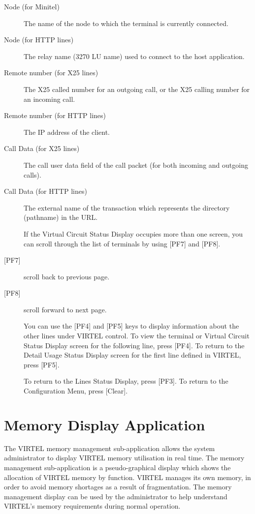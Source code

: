 \documentclass[letterpaper,10pt,english]{sphinxmanual}
\begin{document}
\begin{description}
\item[{Node (for Minitel)}] \leavevmode
The name of the node to which the terminal is currently connected.

\item[{Node (for HTTP lines)}] \leavevmode
The relay name (3270 LU name) used to connect to the host application.

\item[{Remote number (for X25 lines)}] \leavevmode
The X25 called number for an outgoing call, or the X25 calling number for an incoming call.

\item[{Remote number (for HTTP lines)}] \leavevmode
The IP address of the client.

\item[{Call Data (for X25 lines)}] \leavevmode
The call user data field of the call packet (for both incoming and outgoing calls).

\item[{Call Data (for HTTP lines)}] \leavevmode
The external name of the transaction which represents the directory (pathname) in the URL.

If the Virtual Circuit Status Display occupies more than one screen, you can scroll through the list of terminals by using {[}PF7{]} and {[}PF8{]}.

\item[{{[}PF7{]}}] \leavevmode
scroll back to previous page.

\item[{{[}PF8{]}}] \leavevmode
scroll forward to next page.

You can use the {[}PF4{]} and {[}PF5{]} keys to display information about the other lines under VIRTEL control. To view the terminal or Virtual Circuit Status Display screen for the following line, press {[}PF4{]}. To return to the Detail Usage Status Display screen for the first line defined in VIRTEL, press {[}PF5{]}.

To return to the Lines Status Display, press {[}PF3{]}. To return to the Configuration Menu, press {[}Clear{]}.

\end{description}

\newpage

\ignorespaces 

\section{Memory Display Application}
\label{\detokenize{audit_operations_ and_performance:memory-display-application}}\label{\detokenize{audit_operations_ and_performance:index-40}}
The VIRTEL memory management sub-application allows the system  administrator to display VIRTEL memory utilisation in real time. The memory management sub-application is a pseudo-graphical display which shows the allocation of VIRTEL memory by function. VIRTEL manages its own memory, in order to avoid memory shortages as a result of fragmentation. The memory management display can be used by the administrator to help understand VIRTEL’s memory requirements during normal operation.
\end{document}
